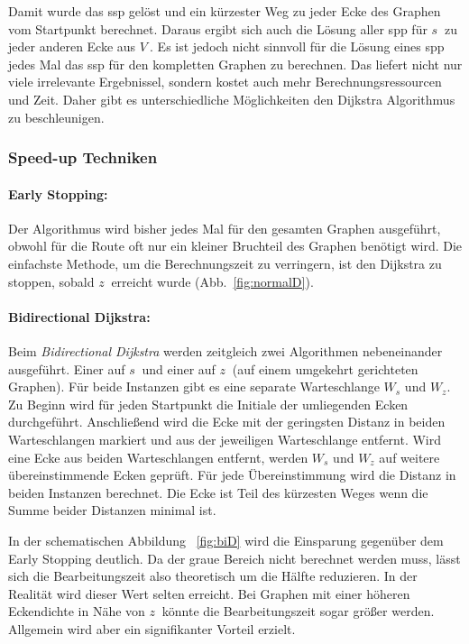 Damit wurde das \gls{ssp} gelöst und ein kürzester Weg zu jeder Ecke des Graphen vom Startpunkt berechnet.
Daraus ergibt sich auch die Lösung aller \gls{spp} für $s~$ zu jeder anderen Ecke aus $V~$.
Es ist jedoch nicht sinnvoll für die Lösung eines \gls{spp} jedes Mal das \gls{ssp} für den kompletten Graphen zu berechnen.
Das liefert nicht nur viele irrelevante Ergebnissel, sondern kostet auch mehr Berechnungsressourcen und Zeit.
Daher gibt es unterschiedliche Möglichkeiten den Dijkstra Algorithmus zu beschleunigen.

\subsubsection{Speed-up Techniken}

\paragraph*{Early Stopping:}
Der Algorithmus wird bisher jedes Mal für den gesamten Graphen ausgeführt, obwohl für die Route oft nur ein kleiner Bruchteil des Graphen benötigt wird.
Die einfachste Methode, um die Berechnungszeit zu verringern, ist den Dijkstra zu stoppen, sobald $z~$ erreicht wurde (Abb.~\ref{fig:normalD}).

\paragraph*{Bidirectional Dijkstra:}
Beim \textit{Bidirectional Dijkstra} werden zeitgleich zwei Algorithmen nebeneinander ausgeführt.
Einer auf $s~$ und einer auf $z~$ (auf einem umgekehrt gerichteten Graphen).
Für beide Instanzen gibt es eine separate Warteschlange $W_{s}$ und $W_{z}$.
Zu Beginn wird für jeden Startpunkt die Initiale der umliegenden Ecken durchgeführt.
Anschließend wird die Ecke mit der geringsten Distanz in beiden Warteschlangen markiert und aus der jeweiligen Warteschlange entfernt.
Wird eine Ecke aus beiden Warteschlangen entfernt, werden $W_{s}$ und $W_{z}$ auf weitere übereinstimmende Ecken geprüft.
Für jede Übereinstimmung wird die Distanz in beiden Instanzen berechnet.
Die Ecke ist Teil des kürzesten Weges wenn die Summe beider Distanzen minimal ist.\par
In der schematischen Abbildung ~\ref{fig:biD} wird die Einsparung gegenüber dem Early Stopping deutlich.
Da der graue Bereich nicht berechnet werden muss, lässt sich die Bearbeitungszeit also theoretisch um die Hälfte reduzieren.
In der Realität wird dieser Wert selten erreicht.
Bei Graphen mit einer höheren Eckendichte in Nähe von $z~$ könnte die Bearbeitungszeit sogar größer werden.
Allgemein wird aber ein signifikanter Vorteil erzielt.

